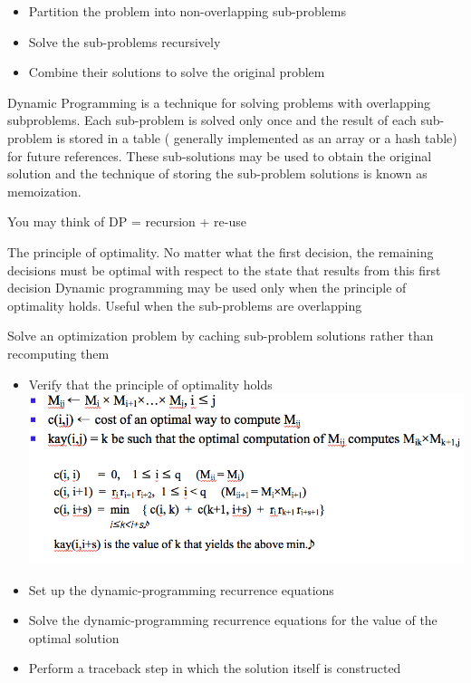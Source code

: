 \documentclass[a4paper,11pt,twoside]{book}
\begin{document}
	\begin{itemize}
		\item Partition the problem into non-overlapping sub-problems
		
		\item Solve the sub-problems recursively
		
		\item Combine their solutions to solve the original problem
	\end{itemize}
	
	
	\par Dynamic Programming is a technique for solving problems with overlapping subproblems. Each sub-problem is solved only once and the result of each sub-problem is stored in a table ( generally implemented as an array or a hash table) for future references. These sub-solutions may be used to obtain the original solution and the technique of storing the sub-problem solutions is known as memoization.
	
	\par You may think of DP = recursion + re-use
	
	
	\par The principle of optimality. No matter what the first decision, the remaining decisions must be optimal with respect to the state that results from this first decision
	Dynamic programming may be used only when the principle of optimality holds. Useful when the sub-problems are overlapping
	
	Solve an optimization problem by caching  sub-problem solutions rather than recomputing them
	
	\begin{itemize}
		\item Verify that the principle of optimality holds  \newline
		\includegraphics[scale=0.45]{pics/Recurrence.png} \newline
		
		\item Set up the dynamic-programming recurrence equations
		\item Solve the dynamic-programming recurrence equations for the value of the optimal solution
		\item Perform a traceback step in which the solution itself is constructed
	\end{itemize}
	
\end{document}
